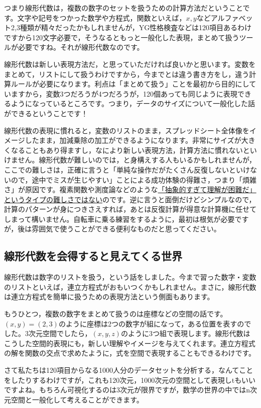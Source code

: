 \documentclass{ltjsbook}
\begin{document}
つまり線形代数は，複数の数字のセットを扱うための計算方法だということです。文字や記号をつかった数学や方程式，関数といえば，$x,y$などアルファベット2,3種類が精々だったかもしれませんが，YG性格検査などは120項目あるわけですから120文字必要で，そうなるともっと一般化した表現，まとめて扱うツールが必要ですね。それが線形代数なのです。

線形代数は新しい表現方法だ，と思っていただければ良いかと思います。変数をまとめて，リストにして扱うわけですから，今までとは違う書き方をし，違う計算ルールが必要になります。利点は「まとめて扱う」ことを最初から目的にしていますから，変数3つだろうが4つだろうが，120個あっても同じように表現できるようになっているところです。つまり，データのサイズについて一般化した話ができるということです！

線形代数の表現に慣れると，変数のリストのまま，スプレッドシート全体像をイメージしたまま，加減乗除の加工ができるようになります。非常にサイズが大きくなることもあり得ますし，なにより新しい表現方法，計算方法に慣れないといけません。線形代数が難しいのでは，と身構えする人もいるかもしれませんが，ここでの難しさは，正確に言うと「単純な操作だがたくさん反復しないといけないので，途中でミスが生じやすい」ことによる成功体験の得難さ，つまり「煩雑さ」が原因です。複素関数や測度論などのような\underline{「抽象的すぎて理解が困難だ」というタイプの難しさではない}のです。逆に言うと面倒だけどシンプルなので，計算のパターンが身につきさえすれば，あとは反復計算が得意な計算機に任せてしまって構いません。自転車に乗る練習をするように，最初は根気が必要ですが，後は雰囲気で使うことができる便利なものだと思ってください。
\subsection{線形代数を会得すると見えてくる世界}
線形代数は数字のリストを扱う，という話をしました。今まで習った数字・変数のリストといえば，連立方程式がおもいつくかもしれません。まさに，線形代数は連立方程式を簡単に扱うための表現方法という側面もあります。

もうひとつ，複数の数字をまとめて扱うのは座標などの空間の話です。$(x,y)=(2,3)$のように座標は2つの数字が組になって，ある位置を表すのでした。3次元空間でしたら，$(x,y,z)$のように3つ組で表現します。線形代数はこうした空間的表現にも，新しい理解やイメージを与えてくれます。連立方程式の解を関数の交点で求めたように，式を空間で表現することもできるわけです。

さて私たちは120項目からなる1000人分のデータセットを分析する，なんてことをしたりするわけですが，これも120次元，1000次元の空間として表現しtもいいですよね。もちろん可視化するのは3次元が限界ですが，数学の世界の中ではn次元空間と一般化して考えることができます。
\end{document}
